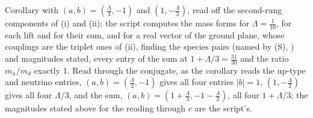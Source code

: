 Corollary  with $(a, b) = (\tfrac{\Lambda}{3}, -1)$ and $(1, -\tfrac{\Lambda}{3})$, read off the second-rung components of (i) and (ii); the script computes the mass forms for $\Lambda = \tfrac{1}{10}$, for each lift and for their sum, and for a real vector of the ground plane, whose couplings are the triplet ones of (ii), finding the species pairs (named by (S), ) and magnitudes stated, every entry of the sum at $1 + \Lambda/3 = \tfrac{31}{30}$ and the ratio $m_{u}/m_{d}$ exactly $1$. Read through the conjugate, as the corollary reads the up-type and neutrino entries, $(a, b) = (\tfrac{\Lambda}{3}, -1)$ gives all four entries $|b| = 1$, $(1, -\tfrac{\Lambda}{3})$ gives all four $\Lambda/3$, and the sum, $(a, b) = (1 + \tfrac{\Lambda}{3}, -1 - \tfrac{\Lambda}{3})$, all four $1 + \Lambda/3$; the magnitudes stated above for the reading through $c$ are the script's.
